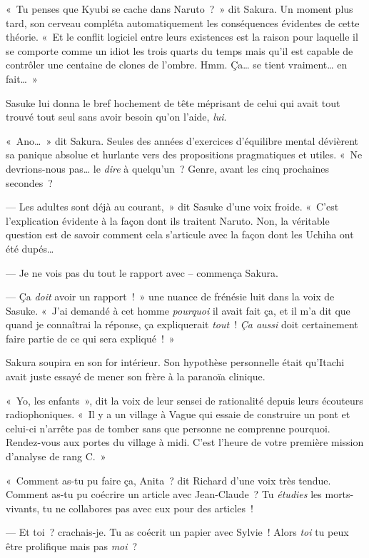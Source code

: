 «~Tu penses que Kyubi se cache dans Naruto~?~» dit Sakura. Un moment plus tard, son cerveau compléta automatiquement les conséquences évidentes de cette théorie. «~Et le conflit logiciel entre leurs existences est la raison pour laquelle il se comporte comme un idiot les trois quarts du temps mais qu'il est capable de contrôler une centaine de clones de l'ombre. Hmm. Ça… se tient vraiment… en fait…~»

Sasuke lui donna le bref hochement de tête méprisant de celui qui avait tout trouvé tout seul sans avoir besoin qu'on l'aide, \emph{lui}.

«~Ano…~» dit Sakura. Seules des années d'exercices d'équilibre mental dévièrent sa panique absolue et hurlante vers des propositions pragmatiques et utiles. «~Ne devrions-nous pas… le \emph{dire} à quelqu'un~? Genre, avant les cinq prochaines secondes~?

--- Les adultes sont déjà au courant,~» dit Sasuke d'une voix froide. «~C'est l'explication évidente à la façon dont ils traitent Naruto. Non, la véritable question est de savoir comment cela s'articule avec la façon dont les Uchiha ont été dupés…

--- Je ne vois pas du tout le rapport avec -- commença Sakura.

--- Ça \emph{doit} avoir un rapport~!~» une nuance de frénésie luit dans la voix de Sasuke. «~J'ai demandé à cet homme \emph{pourquoi} il avait fait ça, et il m'a dit que quand je connaîtrai la réponse, ça expliquerait \emph{tout}~! \emph{Ça aussi} doit certainement faire partie de ce qui sera expliqué~!~»

Sakura soupira en son for intérieur. Son hypothèse personnelle était qu'Itachi avait juste essayé de mener son frère à la paranoïa clinique.

«~Yo, les enfants~», dit la voix de leur sensei de rationalité depuis leurs écouteurs radiophoniques. «~Il y a un village à Vague qui essaie de construire un pont et celui-ci n'arrête pas de tomber sans que personne ne comprenne pourquoi. Rendez-vous aux portes du village à midi. C'est l'heure de votre première mission d'analyse de rang C.~»

\clearpage
{}

«~Comment as-tu pu faire ça, Anita~? dit Richard d'une voix très tendue. Comment as-tu pu coécrire un article avec Jean-Claude~? Tu \emph{étudies} les morts-vivants, tu ne collabores pas avec eux pour des articles~!

--- Et toi~? crachais-je. Tu as coécrit un papier avec Sylvie~! Alors \emph{toi} tu peux être prolifique mais pas \emph{moi}~?


